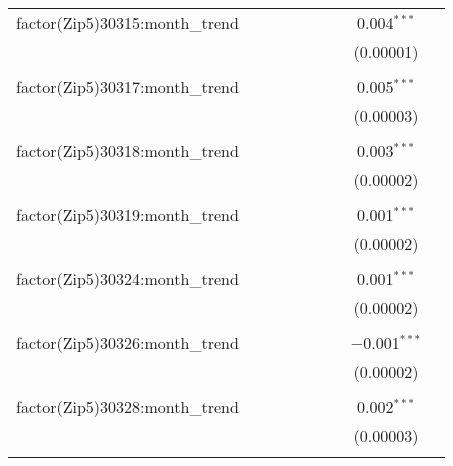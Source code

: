 \begin{table}[H]
{\begin{tabular}{@{\extracolsep{5pt}}lcccccccc}
  factor(Zip5)30315:month\_trend &  &  &  &  &  &  & 0.004$^{***}$ &  \\  

   &  &  &  &  &  &  & (0.00001) &  \\  

   & & & & & & & & \\  

  factor(Zip5)30317:month\_trend &  &  &  &  &  &  & 0.005$^{***}$ &  \\  

   &  &  &  &  &  &  & (0.00003) &  \\  

   & & & & & & & & \\  

  factor(Zip5)30318:month\_trend &  &  &  &  &  &  & 0.003$^{***}$ &  \\  

   &  &  &  &  &  &  & (0.00002) &  \\  

   & & & & & & & & \\  

  factor(Zip5)30319:month\_trend &  &  &  &  &  &  & 0.001$^{***}$ &  \\  

   &  &  &  &  &  &  & (0.00002) &  \\  

   & & & & & & & & \\  

  factor(Zip5)30324:month\_trend &  &  &  &  &  &  & 0.001$^{***}$ &  \\  

   &  &  &  &  &  &  & (0.00002) &  \\  

   & & & & & & & & \\  

  factor(Zip5)30326:month\_trend &  &  &  &  &  &  & $-$0.001$^{***}$ &  \\  

   &  &  &  &  &  &  & (0.00002) &  \\  

   & & & & & & & & \\  

  factor(Zip5)30328:month\_trend &  &  &  &  &  &  & 0.002$^{***}$ &  \\  

   &  &  &  &  &  &  & (0.00003) &  \\  

   & & & & & & & & \\  


\end{tabular}}
\end{table}
